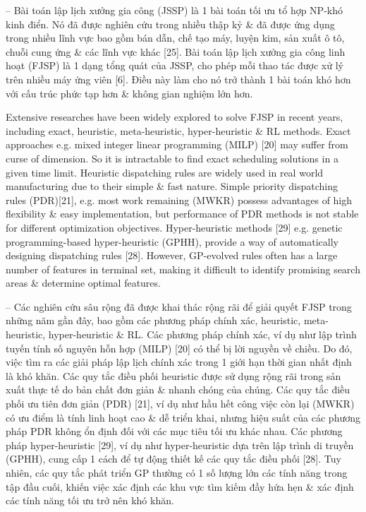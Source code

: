 \documentclass{article}
\begin{document}
\begin{itemize}
    -- Bài toán lập lịch xưởng gia công (JSSP) là 1 bài toán tối ưu tổ hợp NP-khó kinh điển. Nó đã được nghiên cứu trong nhiều thập kỷ \& đã được ứng dụng trong nhiều lĩnh vực bao gồm bán dẫn, chế tạo máy, luyện kim, sản xuất ô tô, chuỗi cung ứng \& các lĩnh vực khác [25]. Bài toán lập lịch xưởng gia công linh hoạt (FJSP) là 1 dạng tổng quát của JSSP, cho phép mỗi thao tác được xử lý trên nhiều máy ứng viên [6]. Điều này làm cho nó trở thành 1 bài toán khó hơn với cấu trúc phức tạp hơn \& không gian nghiệm lớn hơn.

    Extensive researches have been widely explored to solve FJSP in recent years, including exact, heuristic, meta-heuristic, hyper-heuristic \& RL methods. Exact approaches e.g. mixed integer linear programming (MILP) [20] may suffer from curse of dimension. So it is intractable to find exact scheduling solutions in a given time limit. Heuristic dispatching rules are widely used in real world manufacturing due to their simple \& fast nature. Simple priority dispatching rules (PDR)[21], e.g. most work remaining (MWKR) possess advantages of high flexibility \& easy implementation, but performance of PDR methods is not stable for different optimization objectives. Hyper-heuristic methods [29] e.g. genetic programming-based hyper-heuristic (GPHH), provide a way of automatically designing dispatching rules [28]. However, GP-evolved rules often has a large number of features in terminal set, making it difficult to identify promising search areas \& determine optimal features.

    -- Các nghiên cứu sâu rộng đã được khai thác rộng rãi để giải quyết FJSP trong những năm gần đây, bao gồm các phương pháp chính xác, heuristic, meta-heuristic, hyper-heuristic \& RL. Các phương pháp chính xác, ví dụ như lập trình tuyến tính số nguyên hỗn hợp (MILP) [20] có thể bị lời nguyền về chiều. Do đó, việc tìm ra các giải pháp lập lịch chính xác trong 1 giới hạn thời gian nhất định là khó khăn. Các quy tắc điều phối heuristic được sử dụng rộng rãi trong sản xuất thực tế do bản chất đơn giản \& nhanh chóng của chúng. Các quy tắc điều phối ưu tiên đơn giản (PDR) [21], ví dụ như hầu hết công việc còn lại (MWKR) có ưu điểm là tính linh hoạt cao \& dễ triển khai, nhưng hiệu suất của các phương pháp PDR không ổn định đối với các mục tiêu tối ưu khác nhau. Các phương pháp hyper-heuristic [29], ví dụ như hyper-heuristic dựa trên lập trình di truyền (GPHH), cung cấp 1 cách để tự động thiết kế các quy tắc điều phối [28]. Tuy nhiên, các quy tắc phát triển GP thường có 1 số lượng lớn các tính năng trong tập đầu cuối, khiến việc xác định các khu vực tìm kiếm đầy hứa hẹn \& xác định các tính năng tối ưu trở nên khó khăn.


\end{itemize}
\end{document}
